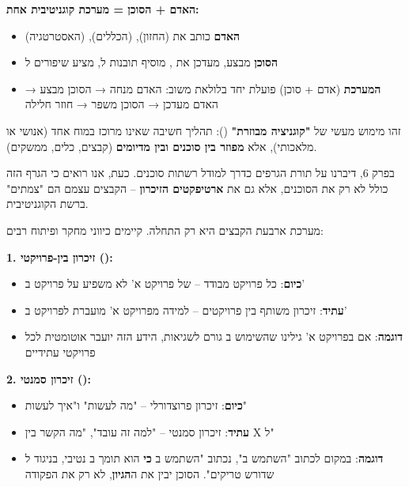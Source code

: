 \textbf{האדם + הסוכן = מערכת קוגניטיבית אחת:}
\begin{itemize}
  \item \textbf{האדם} כותב את  (החזון),  (הכללים),  (האסטרטגיה)
  \item \textbf{הסוכן} מבצע, מעדכן את , מוסיף תובנות ל, מציע שיפורים ל
  \item \textbf{המערכת} (אדם + סוכן) פועלת יחד בלולאת משוב: האדם מנחה → הסוכן מבצע → האדם מעדכן → הסוכן משפר → חוזר חלילה
\end{itemize}

זהו מימוש מעשי של \textbf{"קוגניציה מבוזרת"} (): תהליך חשיבה שאינו מרוכז במוח אחד (אנושי או מלאכותי), אלא \textbf{מפוזר בין סוכנים ובין מדיומים} (קבצים, כלים, ממשקים).

בפרק \num{6}, דיברנו על תורת הגרפים כדרך למודל רשתות סוכנים. כעת, אנו רואים כי הגרף הזה כולל לא רק את הסוכנים, אלא גם את \textbf{ארטיפקטים הזיכרון} – הקבצים עצמם הם "צמתים" ברשת הקוגניטיבית.


מערכת ארבעת הקבצים היא רק התחלה. קיימים כיווני מחקר ופיתוח רבים:

\textbf{\num{1}. זיכרון בין-פרויקטי ():}
\begin{itemize}
  \item \textbf{כיום}: כל פרויקט מבודד –  של פרויקט א' לא משפיע על פרויקט ב'
  \item \textbf{עתיד}: זיכרון משותף בין פרויקטים – למידה מפרויקט א' מועברת לפרויקט ב'
  \item \textbf{דוגמה}: אם בפרויקט א' גילינו שהשימוש ב גורם לשגיאות, הידע הזה יועבר אוטומטית לכל פרויקטי  עתידיים
\end{itemize}

\textbf{\num{2}. זיכרון סמנטי ():}
\begin{itemize}
  \item \textbf{כיום}: זיכרון פרוצדורלי – "מה לעשות" ו"איך לעשות"
  \item \textbf{עתיד}: זיכרון סמנטי – "למה זה עובד", "מה הקשר בין X ל"
  \item \textbf{דוגמה}: במקום לכתוב "השתמש ב", נכתוב "השתמש ב \textbf{כי} הוא תומך ב נטיבי, בניגוד ל שדורש טריקים". הסוכן יבין את ה\textbf{הגיון}, לא רק את הפקודה
\end{itemize}

